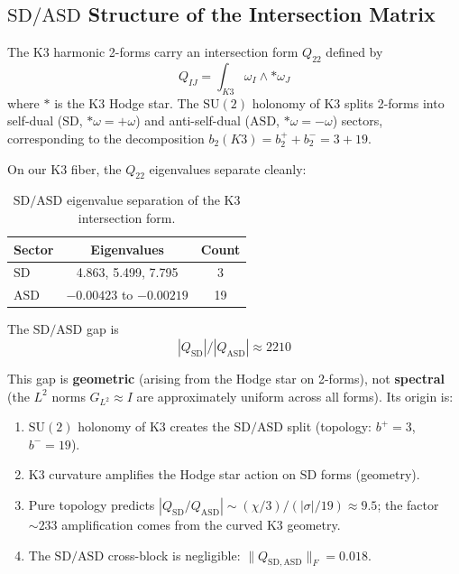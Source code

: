 \documentclass[11pt,a4paper]{article}
\newcommand{\SU}{\mathrm{SU}}
\newcommand{\SD}{\mathrm{SD}}
\newcommand{\ASD}{\mathrm{ASD}}
\theoremstyle{remark}
\begin{document}
\subsection{$\SD/\ASD$ Structure of the Intersection Matrix}

The K3 harmonic 2-forms carry an intersection form $Q_{22}$ defined by
\begin{equation}
Q_{IJ} = \int_{K3} \omega_I \wedge {*}\omega_J
\end{equation}
where ${*}$ is the K3 Hodge star. The $\SU(2)$ holonomy of K3 splits 2-forms into
self-dual ($\SD$, ${*}\omega = +\omega$) and anti-self-dual ($\ASD$, ${*}\omega = -\omega$) sectors, corresponding
to the decomposition $b_2(K3) = b_2^+ + b_2^- = 3 + 19$.

On our K3 fiber, the $Q_{22}$ eigenvalues separate cleanly:

\begin{table}[htbp]
\centering
\begin{tabular}{lcc}
\toprule
Sector & Eigenvalues & Count \\
\midrule
$\SD$ & 4.863, 5.499, 7.795 & 3 \\
$\ASD$ & $-0.00423$ to $-0.00219$ & 19 \\
\bottomrule
\end{tabular}
\caption{$\SD/\ASD$ eigenvalue separation of the K3 intersection form.}
\label{tab:SD_ASD}
\end{table}

The $\SD/\ASD$ gap is
\begin{equation}
|Q_{\SD}| / |Q_{\ASD}| \approx 2210
\end{equation}

This gap is \textbf{geometric} (arising from the Hodge star on 2-forms), not \textbf{spectral}
(the $L^2$ norms $G_{L^2} \approx I$ are approximately uniform across all forms). Its origin is:

\begin{enumerate}
\item $\SU(2)$ holonomy of K3 creates the $\SD/\ASD$ split (topology: $b^+ = 3$, $b^- = 19$).
\item K3 curvature amplifies the Hodge star action on $\SD$ forms (geometry).
\item Pure topology predicts $|Q_{\SD}/Q_{\ASD}| \sim (\chi/3)/(|\sigma|/19) \approx 9.5$; the factor
   $\sim 233$ amplification comes from the curved K3 geometry.
\item The $\SD/\ASD$ cross-block is negligible: $\|Q_{\SD,\ASD}\|_F = 0.018$.
\end{enumerate}
\end{document}
